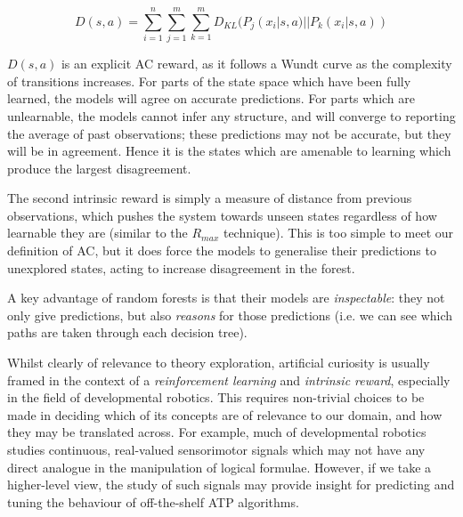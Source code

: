 \documentclass[]{article}
\begin{document}
\begin{equation}
  D(s,a) = \sum_{i = 1}^n \sum_{j = 1}^m \sum_{k = 1}^m D_{KL}(P_j(x_i|s,a) || P_k(x_i|s,a))
\end{equation}

$D(s,a)$ is an explicit AC reward, as it follows a Wundt curve as the complexity of transitions increases. For parts of the state space which have been fully learned, the models will agree on accurate predictions. For parts which are unlearnable, the models cannot infer any structure, and will converge to reporting the average of past observations; these predictions may not be accurate, but they will be in agreement. Hence it is the states which are amenable to learning which produce the largest disagreement.

The second intrinsic reward is simply a measure of distance from previous observations, which pushes the system towards unseen states regardless of how learnable they are (similar to the $R_{max}$ technique). This is too simple to meet our definition of AC, but it does force the models to generalise their predictions to unexplored states, acting to increase disagreement in the forest.

A key advantage of random forests is that their models are \emph{inspectable}: they not only give predictions, but also \emph{reasons} for those predictions (i.e. we can see which paths are taken through each decision tree). %

\cite{Kaplan2006}
\cite{Lipson2007}
\cite{Luciw2011}
\cite{Macedo2000}
\cite{Ramik.Sabourin.Madani:2013}
\cite{Roa.Kruijff.Jacobsson:2009}
\cite{Schaul.Sun.Wierstra.ea:2011}
\cite{Schmidhuber1999}
\cite{Schmidhuber:1991}
\cite{Scott1989}
\cite{Steunebrink.Koutnik.Thorisson.ea:2013}
\cite{maher2008achieving}
\cite{meyer1991possibility}
\cite{oudeyer2004intelligent}
\cite{oudeyer2014evolution}
\cite{schmidhuber2006developmental}


Whilst clearly of relevance to theory exploration, artificial curiosity is usually framed in the context of a \emph{reinforcement learning} and \emph{intrinsic reward}, especially in the field of developmental robotics. This requires non-trivial choices to be made in deciding which of its concepts are of relevance to our domain, and how they may be translated across. For example, much of developmental robotics studies continuous, real-valued sensorimotor signals which may not have any direct analogue in the manipulation of logical formulae. However, if we take a higher-level view, the study of such signals may provide insight for predicting and tuning the behaviour of off-the-shelf ATP algorithms.
\end{document}
